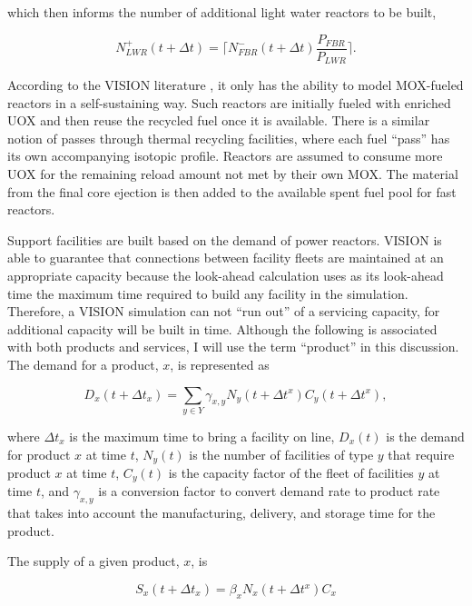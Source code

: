 which then informs the number of additional light water reactors to be built,

\begin{equation}
N^+_{LWR}\left(t+\Delta t\right) = \lceil N^-_{FBR}\left(t+\Delta t\right) 
                        \frac{P_{FBR}}{P_{LWR}} \rceil .
\end{equation}

According to the VISION literature \cite{schweitzer_improved_2008}, it only has
the ability to model MOX-fueled reactors in a self-sustaining way. Such reactors
are initially fueled with enriched UOX and then reuse the recycled fuel once it
is available. There is a similar notion of passes through thermal recycling
facilities, where each fuel ``pass'' has its own accompanying isotopic
profile. Reactors are assumed to consume more UOX for the remaining reload
amount not met by their own MOX. The material from the final core ejection is
then added to the available spent fuel pool for fast reactors.

Support facilities are built based on the demand of power reactors. VISION is
able to guarantee that connections between facility fleets are maintained at an
appropriate capacity because the look-ahead calculation uses as its look-ahead
time the maximum time required to build any facility in the
simulation. Therefore, a VISION simulation can not ``run out'' of a servicing
capacity, for additional capacity will be built in time. Although the following
is associated with both products and services, I will use the term ``product''
in this discussion. The demand for a product, $x$, is represented as

\begin{equation}
D_x(t + \Delta t_x) = \sum_{y \in Y} \gamma_{x,y} N_y(t + \Delta t^x) C_y(t + \Delta t^x),
\end{equation}

where $\Delta t_x$ is the maximum time to bring a facility on line, $D_x(t)$ is
the demand for product $x$ at time $t$, $N_y(t)$ is the number of
facilities of type $y$ that require product $x$ at time $t$, $C_y(t)$ is
the capacity factor of the fleet of facilities $y$ at time $t$, and
$\gamma_{x,y}$ is a conversion factor to convert demand rate to product
rate that takes into account the manufacturing, delivery, and storage time for
the product.

The supply of a given product, $x$, is

\begin{equation}
S_x(t + \Delta t_x) = \beta_x N_x(t + \Delta t^x) C_x
\end{equation}

